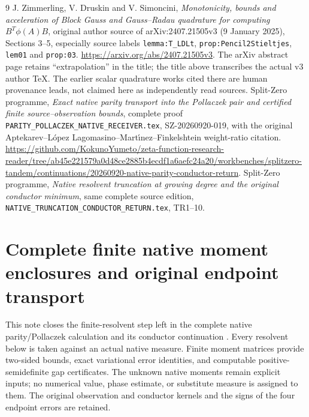 \begin{thebibliography}{9}
 J. Zimmerling, V. Druskin and V. Simoncini,
\emph{Monotonicity, bounds and acceleration of Block Gauss and
Gauss--Radau quadrature for computing $B^T\phi(A)B$}, original
author source of arXiv:2407.21505v3 (9 January 2025),
Sections 3--5, especially source labels
\texttt{lemma:T\_LDLt}, \texttt{prop:Pencil2Stieltjes},
\texttt{lem01} and \texttt{prop:03}.
\url{https://arxiv.org/abs/2407.21505v3}.
The arXiv abstract page retains ``extrapolation'' in the title;
the title above transcribes the actual v3 author TeX.
The earlier scalar quadrature works cited there are human
provenance leads, not claimed here as independently read sources.
 Split-Zero programme, \emph{Exact native parity transport
into the Pollaczek pair and certified finite source--observation bounds},
complete proof \texttt{PARITY\_POLLACZEK\_NATIVE\_RECEIVER.tex},
SZ-20260920-019, with the original Aptekarev--L\'opez
Lagomasino--Mart\'{\i}nez--Finkelshtein weight-ratio citation.
\url{https://github.com/KokunoYumeto/zeta-function-research-reader/tree/ab45e221579a0d48ce2885b4ecdf1a6aefc24a20/workbenches/splitzero-tandem/continuations/20260920-native-parity-conductor-return}.
 Split-Zero programme, \emph{Native resolvent truncation at
growing degree and the original conductor minimum}, same complete
source edition, \texttt{NATIVE\_TRUNCATION\_CONDUCTOR\_RETURN.tex}, TR1--10.
\end{thebibliography}

\endgroup

\clearpage\begingroup
\part*{Complete finite native moment enclosures and original endpoint transport}
\newtheorem{mmnativetheorem}{Theorem}
\newtheorem{mmnativelemma}[mmnativetheorem]{Lemma}
\newtheorem{mmnativeproposition}[mmnativetheorem]{Proposition}
\newcommand{\mmnativeC}{\mathbb C}
\newcommand{\mmnativeR}{\mathbb R}
\newcommand{\mmnativediag}{\operatorname{diag}}
\newcommand{\mmnativeim}{\operatorname{im}}
\newcommand{\mmnativetr}{\operatorname{tr}}
\newcommand{\mmnativenorm}[1]{\left\lVert#1\right\rVert}


This note closes the finite-resolvent step left in the complete native
parity/Pollaczek calculation \cite{mmnative:PP} and its conductor continuation
\cite{mmnative:TR}.  Every resolvent below is taken against an actual native
measure.  Finite moment matrices provide two-sided bounds, exact
variational error identities, and computable positive-semidefinite gap
certificates.  The unknown native moments remain explicit inputs; no
numerical value, phase estimate, or substitute measure is assigned to
them.  The original observation and conductor kernels and the signs of
the four endpoint errors are retained.


